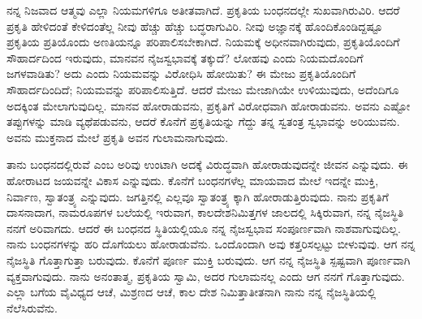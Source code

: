 ನನ್ನ ನಿಜವಾದ ಆತ್ಮವು ಎಲ್ಲಾ ನಿಯಮಗಳಿಗೂ ಅತೀತವಾಗಿದೆ. ಪ್ರಕೃತಿಯ ಬಂಧನದಲ್ಲೇ ಸುಖವಾಗಿರುವಿರಿ. ಆದರೆ ಪ್ರಕೃತಿ ಹೇಳಿದಂತೆ ಕೇಳಿದಂತೆಲ್ಲ ನೀವು ಹೆಚ್ಚು ಹೆಚ್ಚು ಬದ್ಧರಾಗುವಿರಿ. ನೀವು ಅಜ್ಞಾನಕ್ಕೆ ಹೊಂದಿಕೊಂಡಿದ್ದಷ್ಟೂ ಪ್ರಕೃತಿಯ ಪ್ರತಿಯೊಂದು ಅಣತಿಯನ್ನೂ ಪರಿಪಾಲಿಸಬೇಕಾಗಿದೆ. ನಿಯಮಕ್ಕೆ ಅಧೀನವಾಗಿರುವುದು, ಪ್ರಕೃತಿಯೊಂದಿಗೆ ಸೌಹಾರ್ದದಿಂದ ಇರುವುದು, ಮಾನವನ ನೈಜಸ್ವಭಾವಕ್ಕೆ ತಕ್ಕುದೆ? ಲೋಹವು ಎಂದು ನಿಯಮದೊಂದಿಗೆ ಜಗಳವಾಡಿತು? ಅದು ಎಂದು ನಿಯಮವನ್ನು ವಿರೋಧಿಸಿ ಹೋಯಿತು? ಈ ಮೇಜು ಪ್ರಕೃತಿಯೊಂದಿಗೆ ಸೌಹಾರ್ದದಿಂದಿದೆ; ನಿಯಮವನ್ನು ಪರಿಪಾಲಿಸುತ್ತಿದೆ. ಆದರೆ ಮೇಜು ಮೇಜಾಗಿಯೇ ಉಳಿಯುವುದು, ಅದೆಂದಿಗೂ ಅದಕ್ಕಿಂತ ಮೇಲಾಗುವುದಿಲ್ಲ. ಮಾನವ ಹೋರಾಡುವನು, ಪ್ರಕೃತಿಗೆ ವಿರೋಧವಾಗಿ ಹೋರಾಡುವನು. ಅವನು ಎಷ್ಟೋ ತಪ್ಪುಗಳನ್ನು ಮಾಡಿ ವ್ಯಥೆಪಡುವನು, ಆದರೆ ಕೊನೆಗೆ ಪ್ರಕೃತಿಯನ್ನು ಗೆದ್ದು ತನ್ನ ಸ್ವತಂತ್ರ ಸ್ವಭಾವನ್ನು ಅರಿಯುವನು. ಅವನು ಮುಕ್ತನಾದ ಮೇಲೆ ಪ್ರಕೃತಿ ಅವನ ಗುಲಾಮನಾಗುವುದು.

ತಾನು ಬಂಧನದಲ್ಲಿರುವೆ ಎಂಬ ಅರಿವು ಉಂಟಾಗಿ ಅದಕ್ಕೆ ವಿರುದ್ಧವಾಗಿ ಹೋರಾಡುವುದನ್ನೇ ಜೀವನ ಎನ್ನುವುದು. ಈ ಹೋರಾಟದ ಜಯವನ್ನೇ ವಿಕಾಸ  ಎನ್ನುವುದು. ಕೊನೆಗೆ ಬಂಧನಗಳೆಲ್ಲ ಮಾಯವಾದ ಮೇಲೆ ಇದನ್ನೇ ಮುಕ್ತಿ, ನಿರ್ವಾಣ, ಸ್ವಾತಂತ್ರ್ಯ ಎನ್ನುವುದು. ಜಗತ್ತಿನಲ್ಲಿ ಎಲ್ಲವೂ ಸ್ವಾತಂತ್ರ್ಯ ಕ್ಕಾಗಿ ಹೋರಾಡುತ್ತಿರುವುದು. ನಾನು ಪ್ರಕೃತಿಗೆ ದಾಸನಾದಾಗ, ನಾಮರೂಪಗಳ ಬಲೆಯಲ್ಲಿ ಇರುವಾಗ, ಕಾಲದೇಶನಿಮಿತ್ತಗಳ ಜಾಲದಲ್ಲಿ ಸಿಕ್ಕಿರುವಾಗ, ನನ್ನ ನೈಜಸ್ಥಿತಿ ನನಗೆ ಅರಿವಾಗದು. ಆದರೆ ಈ ಬಂಧನದ ಸ್ಥಿತಿಯಲ್ಲಿಯೂ ನನ್ನ ನೈಜಸ್ವಭಾವ ಸಂಪೂರ್ಣವಾಗಿ ನಾಶವಾಗುವುದಿಲ್ಲ. ನಾನು ಬಂಧನಗಳನ್ನು ಹರಿ ದೊಗೆಯಲು ಹೋರಾಡುವೆನು. ಒಂದೊಂದಾಗಿ ಅವು ಕತ್ತರಿಸಲ್ಪಟ್ಟು ಬೀಳುವುವು. ಆಗ ನನ್ನ ನೈಜಸ್ಥಿತಿ ಗೊತ್ತಾಗುತ್ತಾ ಬರುವುದು. ಕೊನೆಗೆ ಪೂರ್ಣ ಮುಕ್ತಿ ಬರುವುದು. ಆಗ ನನ್ನ ನೈಜಸ್ಥಿತಿ ಸ್ಪಷ್ಟವಾಗಿ ಪೂರ್ಣವಾಗಿ ವ್ಯಕ್ತವಾಗುವುದು. ನಾನು ಅನಂತಾತ್ಮ, ಪ್ರಕೃತಿಯ ಸ್ವಾಮಿ, ಅದರ ಗುಲಾಮನಲ್ಲ ಎಂದು ಆಗ ನನಗೆ ಗೊತ್ತಾಗುವುದು. ಎಲ್ಲಾ ಬಗೆಯ ವೈವಿಧ್ಯದ ಆಚೆ, ಮಿಶ್ರಣದ ಆಚೆ, ಕಾಲ ದೇಶ ನಿಮಿತ್ತಾತೀತನಾಗಿ ನಾನು ನನ್ನ ನೈಜಸ್ಥಿತಿಯಲ್ಲಿ ನೆಲೆಸಿರುವೆನು.

